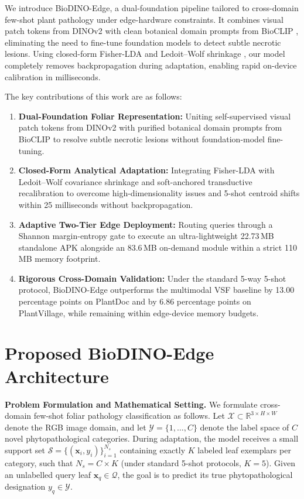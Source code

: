 \documentclass[conference]{IEEEtran}
\begin{document}
We introduce BioDINO-Edge, a dual-foundation pipeline tailored to cross-domain few-shot plant pathology under edge-hardware constraints. It combines visual patch tokens from DINOv2 \cite{oquab2023dinov2} with clean botanical domain prompts from BioCLIP \cite{stevens2024bioclip}, eliminating the need to fine-tune foundation models to detect subtle necrotic lesions. Using closed-form Fisher-LDA \cite{fisher1936use} and Ledoit--Wolf shrinkage \cite{ledoit2004well}, our model completely removes backpropagation during adaptation, enabling rapid on-device calibration in milliseconds.

The key contributions of this work are as follows:
\begin{enumerate}
    \item \textbf{Dual-Foundation Foliar Representation:} Uniting self-supervised visual patch tokens from DINOv2 with purified botanical domain prompts from BioCLIP to resolve subtle necrotic lesions without foundation-model fine-tuning.
    \item \textbf{Closed-Form Analytical Adaptation:} Integrating Fisher-LDA with Ledoit--Wolf covariance shrinkage and soft-anchored transductive recalibration to overcome high-dimensionality issues and 5-shot centroid shifts within 25 milliseconds without backpropagation.
    \item \textbf{Adaptive Two-Tier Edge Deployment:} Routing queries through a Shannon \cite{shannon1948mathematical} margin-entropy gate to execute an ultra-lightweight 22.73\,MB standalone APK alongside an 83.6\,MB on-demand module within a strict 110\,MB memory footprint.
    \item \textbf{Rigorous Cross-Domain Validation:} Under the standard 5-way 5-shot protocol, BioDINO-Edge outperforms the multimodal VSF baseline by 13.00 percentage points on PlantDoc and by 6.86 percentage points on PlantVillage, while remaining within edge-device memory budgets.
\end{enumerate}

\section{Proposed BioDINO-Edge Architecture}
\label{sec:methodology}

\textbf{Problem Formulation and Mathematical Setting.} We formulate cross-domain few-shot foliar pathology classification as follows. Let $\mathcal{X} \subset \mathbb{R}^{3 \times H \times W}$ denote the RGB image domain, and let $\mathcal{Y} = \{1, \dots, C\}$ denote the label space of $C$ novel phytopathological categories. During adaptation, the model receives a small support set $\mathcal{S} = \{(\mathbf{x}_i, y_i)\}_{i=1}^{N_s}$ containing exactly $K$ labeled leaf exemplars per category, such that $N_s = C \times K$ (under standard 5-shot protocols, $K=5$). Given an unlabelled query leaf $\mathbf{x}_q \in \mathcal{Q}$, the goal is to predict its true phytopathological designation $y_q \in \mathcal{Y}$.
\end{document}

